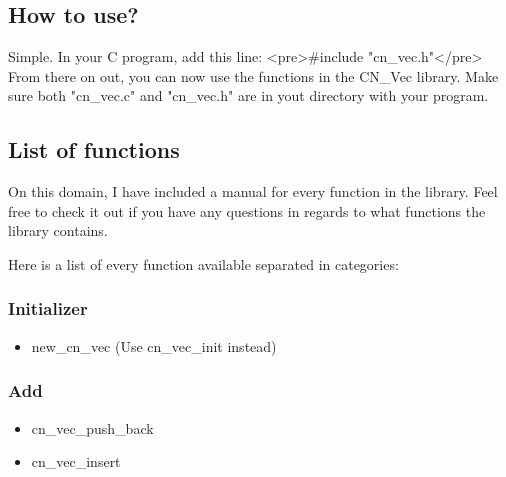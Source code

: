 \documentclass[12pt]{article}
\begin{document}
\subsection{How to use?}
	Simple. In your C program, add this line:
	<pre>#include "cn_vec.h"</pre>
	From there on out, you can now use the functions in the CN_Vec library. Make sure both "cn_vec.c" and "cn_vec.h" are in yout directory with your program.


\subsection{List of functions}On this domain, I have included a manual for every function in the library. Feel free to check it out if you have any questions in regards to what functions the library contains.

Here is a list of every function available separated in categories:

\subsubsection{Initializer}\begin{itemize}
	\item new_cn_vec (Use cn_vec_init instead)

\end{itemize}
\subsubsection{Add}\begin{itemize}
	\item cn_vec_push_back

	\item cn_vec_insert

\end{itemize}
\end{document}
